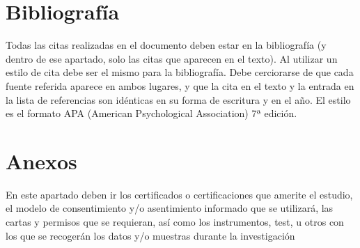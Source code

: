 \documentclass[12pt,a4paper]{article}
\begin{document}
\section{Bibliografía}

\noindent
Todas las citas realizadas en el documento deben estar en la bibliografía (y dentro de ese apartado, solo las citas que aparecen en el texto). Al utilizar un estilo de cita debe ser el mismo para
la bibliografía. Debe cerciorarse de que cada fuente referida aparece en ambos
lugares, y que la cita en el texto y la entrada en la lista de referencias son idénticas en
su forma de escritura y en el año. El estilo es el formato APA (American Psychological Association) 7ª edición.\\


\section{Anexos}
\noindent
En este apartado deben ir los certificados o certificaciones que amerite el estudio, el
modelo de consentimiento y/o asentimiento informado que se utilizará, las cartas y
permisos que se requieran, así como los instrumentos, test, u otros con los que se
recogerán los datos y/o muestras durante la investigación
\end{document}
